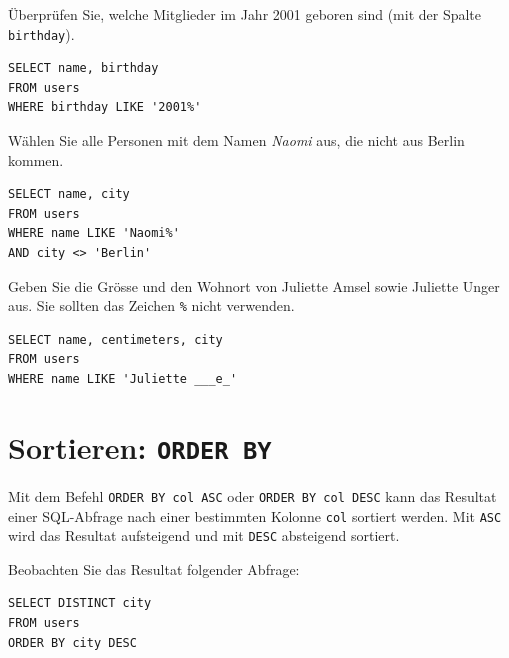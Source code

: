 \begin{mychallenge}
  Überprüfen Sie, welche Mitglieder im Jahr 2001 geboren sind (mit der Spalte \texttt{birthday}).
  \begin{myanswer}
    \begin{lstlisting}
SELECT name, birthday
FROM users
WHERE birthday LIKE '2001%'
\end{lstlisting}
  \end{myanswer}
\end{mychallenge}

\begin{myexercise}
  Wählen Sie alle Personen mit dem Namen \textit{Naomi} aus, die nicht aus Berlin kommen.
  \begin{myanswer}
    \begin{lstlisting}
SELECT name, city
FROM users
WHERE name LIKE 'Naomi%'
AND city <> 'Berlin'
\end{lstlisting}
  \end{myanswer}
\end{myexercise}

\begin{mychallenge}
  Geben Sie die Grösse und den Wohnort von Juliette Amsel sowie Juliette Unger aus. Sie sollten das Zeichen \lstinline|%| nicht verwenden.
  \begin{myanswer}
    \begin{lstlisting}
SELECT name, centimeters, city
FROM users
WHERE name LIKE 'Juliette ___e_'
\end{lstlisting}
  \end{myanswer}
\end{mychallenge}

\section{Sortieren: \texorpdfstring{\lstinline|ORDER BY|}{ORDER BY}}

Mit dem Befehl \lstinline|ORDER BY col ASC| oder \lstinline|ORDER BY col DESC| kann das Resultat einer \gls{SQL}-Abfrage nach einer bestimmten Kolonne \lstinline|col| sortiert werden. Mit \lstinline|ASC| wird das Resultat aufsteigend und mit \lstinline|DESC| absteigend sortiert.

\begin{myexample}
Beobachten Sie das Resultat folgender Abfrage:

\begin{lstlisting}
SELECT DISTINCT city
FROM users
ORDER BY city DESC
\end{lstlisting}
\end{myexample}

